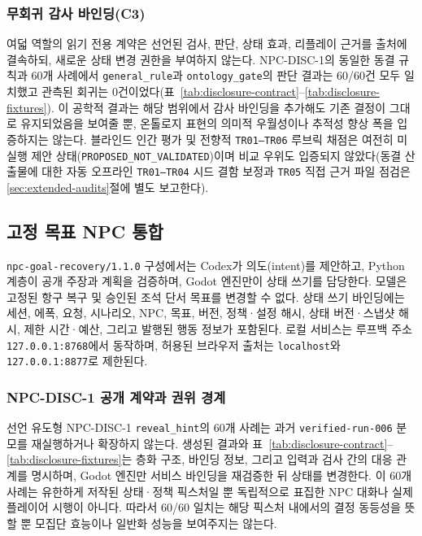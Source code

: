 \documentclass[journal]{IEEEtran}
\begin{document}
\subsubsection{무회귀 감사 바인딩(C3)}
여덟 역할의 읽기 전용 계약은 선언된 검사, 판단, 상태 효과, 리플레이 근거를 출처에 결속하되, 새로운 상태 변경 권한을 부여하지 않는다. NPC-DISC-1의 동일한 동결 규칙과 60개 사례에서 \texttt{general\_rule}과 \texttt{ontology\_gate}의 판단 결과는 60/60건 모두 일치했고 관측된 회귀는 0건이었다(표~\ref{tab:disclosure-contract}--\ref{tab:disclosure-fixtures}). 이 공학적 결과는 해당 범위에서 감사 바인딩을 추가해도 기존 결정이 그대로 유지되었음을 보여줄 뿐, 온톨로지 표현의 의미적 우월성이나 추적성 향상 폭을 입증하지는 않는다. 블라인드 인간 평가 및 전향적 \texttt{TR01--TR06} 루브릭 채점은 여전히 미실행 제안 상태(\texttt{PROPOSED\_NOT\_VALIDATED})이며 비교 우위도 입증되지 않았다(동결 산출물에 대한 자동 오프라인 \texttt{TR01--TR04} 시드 결함 보정과 \texttt{TR05} 직접 근거 파일 점검은 \ref{sec:extended-audits}절에 별도 보고한다).


\subsection{고정 목표 NPC 통합}
\texttt{npc-goal-recovery/1.1.0} 구성에서는 Codex가 의도(intent)를 제안하고, Python 계층이 공개 주장과 계획을 검증하며, Godot 엔진만이 상태 쓰기를 담당한다. 모델은 고정된 항구 복구 및 승인된 조석 단서 목표를 변경할 수 없다. 상태 쓰기 바인딩에는 세션, 에폭, 요청, 시나리오, NPC, 목표, 버전, 정책·설정 해시, 상태 버전·스냅샷 해시, 제한 시간·예산, 그리고 발행된 행동 정보가 포함된다. 로컬 서비스는 루프백 주소 \texttt{127.0.0.1:8768}에서 동작하며, 허용된 브라우저 출처는 \texttt{localhost}와 \texttt{127.0.0.1:8877}로 제한된다.
\subsubsection{NPC-DISC-1 공개 계약과 권위 경계}\label{sec:disclosure-contract}
선언 유도형 NPC-DISC-1 \texttt{reveal\_hint}의 60개 사례는 과거 \texttt{verified-run-006} 분모를 재실행하거나 확장하지 않는다. 생성된 결과와 표~\ref{tab:disclosure-contract}--\ref{tab:disclosure-fixtures}는 층화 구조, 바인딩 정보, 그리고 입력과 검사 간의 대응 관계를 명시하며, Godot 엔진만 서비스 바인딩을 재검증한 뒤 상태를 변경한다.
이 60개 사례는 유한하게 저작된 상태·정책 픽스처일 뿐 독립적으로 표집한 NPC 대화나 실제 플레이어 시행이 아니다. 따라서 60/60 일치는 해당 픽스처 내에서의 결정 동등성을 뜻할 뿐 모집단 효능이나 일반화 성능을 보여주지는 않는다.
\end{document}
